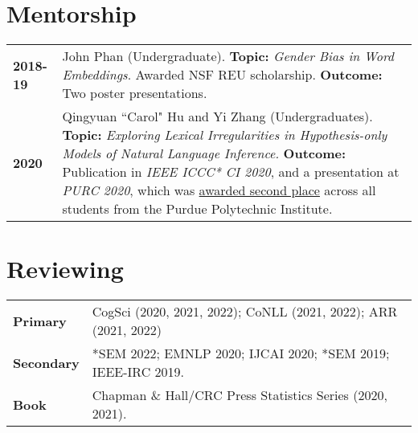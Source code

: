 \documentclass[11pt]{article}
\begin{document}
\renewcommand*{\arraystretch}{1.5}

\section*{Mentorship}
\vspace{-1em}
\begin{longtable}{p{}  p{} }
    \textbf{2018-19} & John Phan (Undergraduate). \textbf{Topic:} \textit{Gender Bias in Word Embeddings}. Awarded NSF REU scholarship. \textbf{Outcome:} Two poster presentations.\\
    \textbf{2020} & Qingyuan ``Carol" Hu and Yi Zhang (Undergraduates). \textbf{Topic:} \textit{Exploring Lexical Irregularities in Hypothesis-only Models of Natural Language Inference.} \textbf{Outcome:} Publication in \textit{IEEE ICCC* CI 2020}, and a presentation at \textit{PURC 2020}, which was \underline{awarded second place} across all students from the Purdue Polytechnic Institute.
\end{longtable}

\section*{Reviewing}
\vspace{-1em}
\begin{longtable}{p{}  p{} }
    \textbf{Primary} & CogSci (2020, 2021, 2022); CoNLL (2021, 2022); ARR (2021, 2022)\\
    \textbf{Secondary} & *SEM 2022; EMNLP 2020; IJCAI 2020; *SEM 2019; IEEE-IRC 2019.\\
    \textbf{Book} & Chapman \& Hall/CRC Press Statistics Series (2020, 2021).
\end{longtable}
\end{document}
